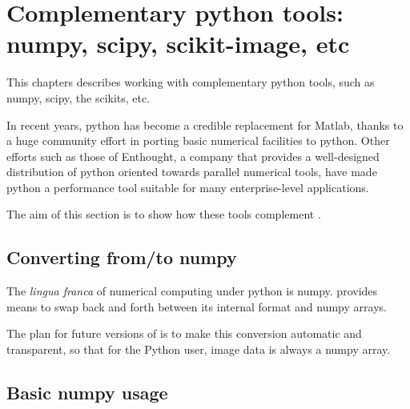 \chapter{Complementary python tools: numpy, scipy, scikit-image, etc}\label{chap:python-tools}
This chapters describes working with complementary python tools, such as numpy, scipy, the scikits, etc. 

In recent years, python has become a credible replacement for Matlab, thanks to a huge community effort in porting basic numerical facilities to python. Other efforts such as those of Enthought, a company that provides a well-designed distribution of python oriented towards parallel numerical tools, have made python a performance tool suitable for many enterprise-level applications.

The aim of this section is to show how these tools complement \Pink.

\section{Converting from/to numpy}
The {\em lingua franca} of numerical computing under python is numpy. \Pink provides means to swap back and forth between its internal format and numpy arrays.


The plan for future versions of \Pink is to make this conversion automatic and transparent, so that 
for the Python user, \Pink image data is always a numpy array.

\section{Basic numpy usage}

